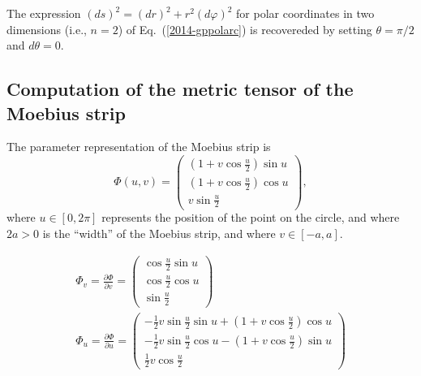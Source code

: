 {The expression $(ds)^2 =(dr)^2+r^2(d\varphi )^2$
for polar coordinates in two dimensions (i.e., $n=2$) of Eq.~(\ref{2014-gppolarc})  is recovereded by setting $\theta = \pi/2 $ and $d\theta =0$.

\subsection*{Computation of the metric tensor of the Moebius strip}
The parameter representation of the Moebius strip is
\begin{equation}
\Phi (u,v) =\left(
\begin{array}{c}
(1+v\cos \frac{u}{2})\sin u \\
(1+v\cos \frac{u}{2})\cos u \\
v\sin \frac{u}{2}
\end{array}
\right),
\end{equation}
where
$u\in [0,2\pi ]$ represents the position of the point on the circle,  and where $2a>0$ is the ``width'' of the Moebius strip,
and where $v\in [-a,a]$.


\begin{equation}
\begin{split}
\Phi _{v}=\frac{\partial \Phi }{\partial v}=\allowbreak
\begin{pmatrix}
\cos \frac{u}{2}\sin u \\
\cos \frac{u}{2}\cos u \\
\sin \frac{u}{2}
\end{pmatrix}
 \\
\Phi _{u}=\frac{\partial \Phi }{\partial u}=\allowbreak
\begin{pmatrix}
-\frac{1}{2}v\sin \frac{u}{2}\sin u+\left( 1+v\cos \frac{u}{2}\right) \cos u \\
-\frac{1}{2}v\sin \frac{u}{2}\cos u-\left( 1+v\cos \frac{u}{2}\right) \sin u \\
\frac{1}{2}v\cos \frac{u}{2}
\end{pmatrix}
\end{split}
\end{equation}


}
